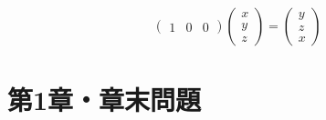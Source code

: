 \documentclass[uplatex,dvipdfmx,a4paper,10pt,fleqn]{jsarticle}
\begin{document}
\begin{tleftbar}
\begin{description}
\[\begin{pmatrix}
                1 & 0 & 0
            \end{pmatrix}
            \begin{pmatrix}
                x \\
                y \\
                z
            \end{pmatrix}
            =\begin{pmatrix}
                y \\
                z \\
                x
            \end{pmatrix}
            \]
        \end{description}
        \end{tleftbar}


        \setcounter{equation}{0}

\section*{第1章・章末問題}
\end{document}
